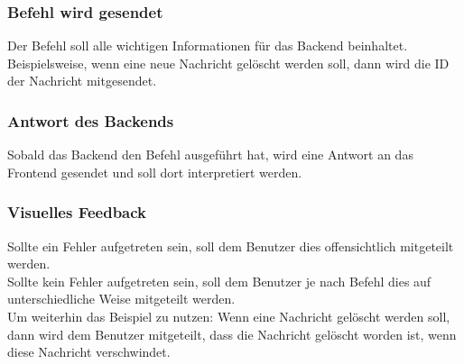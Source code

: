 \subsubsection{Befehl wird gesendet}
Der Befehl soll alle wichtigen Informationen für das Backend beinhaltet. Beispielsweise, wenn eine neue Nachricht gelöscht werden soll, dann wird die ID der Nachricht mitgesendet.

\subsubsection{Antwort des Backends}
Sobald das Backend den Befehl ausgeführt hat, wird eine Antwort an das Frontend gesendet und soll dort interpretiert werden.

\subsubsection{Visuelles Feedback}
Sollte ein Fehler aufgetreten sein, soll dem Benutzer dies offensichtlich mitgeteilt werden.\\Sollte kein Fehler aufgetreten sein, soll dem Benutzer je nach Befehl dies auf unterschiedliche Weise mitgeteilt werden.\\Um weiterhin das Beispiel zu nutzen: Wenn eine Nachricht gelöscht werden soll, dann wird dem Benutzer mitgeteilt, dass die Nachricht gelöscht worden ist, wenn diese Nachricht verschwindet.